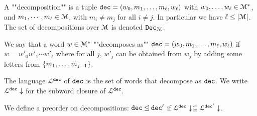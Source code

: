 \begin{definition}
	A ""decomposition"" is a tuple $\mathtt{dec} = (w_0, m_1, \ldots, m_\ell, w_\ell)$ with $w_0, \ldots, w_\ell \in \mathcal{M}^*$, and $m_1, \cdots, m_\ell \in \mathcal{M}$, with $m_i \neq m_j$ for all $i\neq j$. In particular we have $\ell \leq |\mathcal{M}|$. The set of decompositions over $\mathcal{M}$ is denoted $\mathtt{Dec}_{\mathcal{M}}$.
	
	We say that a word $w \in \mathcal{M}^*$ ""decomposes as"" $\mathtt{dec} = (w_0, m_1, \ldots, m_\ell, w_\ell)$ if $w = w'_0 w'_1 \cdots w'_\ell$ where for all $j$, $w'_j$ can be obtained from $w_j$ by adding some letters from $\{m_1, \ldots, m_{j-1}\}$.
	
	The language $\mathcal{L}^{\mathtt{\mathtt{dec}}}$ of $\mathtt{dec}$ is the set of words that decompose as $\mathtt{dec}$. We write $\mathcal{L}^{\mathtt{\mathtt{dec}}}\downarrow$ for the subword closure of $\mathcal{L}^{\mathtt{\mathtt{dec}}}$.
	
	We define a preorder on decompositions:
	$\mathtt{dec} \unlhd \mathtt{dec}'$ if $\mathcal{L}^{\mathtt{\mathtt{dec}}}\downarrow \subseteq \mathcal{L}^{\mathtt{\mathtt{dec}'}}\downarrow$.
\end{definition}


